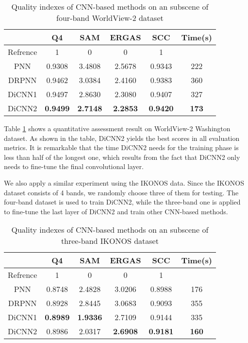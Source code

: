 \documentclass[journal]{IEEEtran}
\begin{document}
\begin{table}[htp]
\small
\caption{Quality indexes of CNN-based methods on an  subscene of four-band WorldView-2 dataset}
\centering
\begin{tabular}{c|ccccc}
\hline
{}&Q4&SAM& ERGAS &SCC&Time(s)\\
\hline
Refrence&1 &0 &0 &1&{}\\
\hline
\hline
PNN &0.9308 &3.4808 &2.5678 &0.9343&222\\
\hline
DRPNN &0.9462 &3.0384 &2.4160 &0.9383&360\\
\hline
DiCNN1 &0.9497 &2.8630 &2.3080 &0.9407 &327\\
\hline
DiCNN2 &\textbf{0.9499} &\textbf{2.7148} &\textbf{2.2853}  &\textbf{0.9420} &\textbf{173}\\
\hline
\end{tabular}
\label{table:transwv}
\end{table}

Table \ref{table:transwv} shows a quantitative assessment result on WorldView-2 Washington dataset. As shown in the table, DiCNN2 yields the best scores in all evaluation metrics. It is remarkable that the time DiCNN2 needs for the training phase is less than half of the longest one, which results from the fact that DiCNN2 only needs to fine-tune the final convolutional layer.

We also apply a similar experiment using the IKONOS data. Since the IKONOS dataset consists of 4 bands, we randomly choose three of them for testing. The four-band dataset is used to train DiCNN2, while the three-band one is applied to fine-tune the last layer of DiCNN2 and train other CNN-based methods.

\begin{table}[htp]
\small
\caption{Quality indexes of CNN-based methods on an  subscene of three-band IKONOS dataset}
\centering
\begin{tabular}{c|ccccc}
\hline
{}&Q4&SAM& ERGAS &SCC&Time(s)\\
\hline
Refrence&1 &0 &0 &1&{}\\
\hline
\hline
PNN &0.8748 &2.4828 &3.0206 &0.8988&176\\
\hline
DRPNN &0.8928 &2.8445 &3.0683 &0.9093&355\\
\hline
DiCNN1 &\textbf{0.8989} &\textbf{1.9336} &2.7109 &0.9144 &335\\
\hline
DiCNN2 &0.8986&2.0317 &\textbf{2.6908}  &\textbf{0.9181} &\textbf{160}\\
\hline
\end{tabular}
\label{table:transik}
\end{table}
\end{document}
